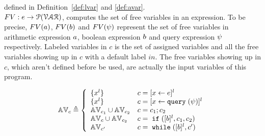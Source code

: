 {defined in Definition~\ref{def:lvar} and \ref{def:avar}.
%
\\
$FV: e \to \mathcal{P}(\mathcal{VAR})$, computes the set of free variables in an expression. To be precise,
$FV(a)$, $FV(b)$ and $FV(\psi)$ represent the set of free variables in arithmetic
expression $a$, boolean expression $b$ and query expression $\psi$ respectively.
Labeled variables in $c$ is the set of assigned variables and all the free variables
showing up in $c$ with a default label $in$. 
The free variables
showing up in $c$, which aren't defined before be used, are actually the input variables of this program.
%
\begin{defn}
\label{def:avar}
{\footnotesize
$$ \avar_{c} \triangleq
  \left\{
  \begin{array}{ll}
      \{{x}^l\}                   
      & {c} = [{\assign x e}]^{l} 
      \\
      \{{x}^l\}                   
      & {c} = [{\assign x \query(\qexpr)}]^{l} 
      \\
      \avar_{{c_1}} \cup \avar_{{c_2}}  
      & {c} = {c_1};{c_2}
      \\
      \avar_{{c}} \cup \avar_{{c_2}} 
      & {c} =\eif([\bexpr]^{l}, c_1, c_2) 
      \\
      \avar_{{c}'}
      & {c}   = \ewhile ([\bexpr]^{l}, {c}')
\end{array}
\right.
$$
}
\end{defn}
%

}
